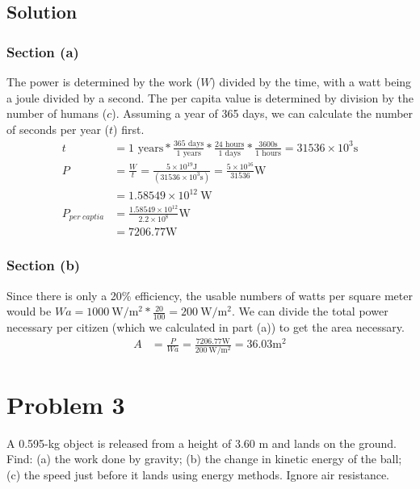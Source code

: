 \documentclass[12pt]{article}
\begin{document}
\subsection*{Solution}
\subsubsection*{Section (a)}
The power is determined by the work ($W$) divided by the time, with a watt being a joule divided by a second. The per capita value is determined by division by the number of humans ($c$). Assuming a year of 365 days, we can calculate the number of seconds per year ($t$) first.
\begin{align*}
    t   &=  1 \text{ years} * \frac{365\text{ days}}{1\text{ years}} 
                            * \frac{24\text{ hours}}{1\text{ days}}
                            * \frac{3600\unit{\second}}{1\text{ hours}}
        =   31536 \times 10^3 \unit{\second}\\
    P   &=  \frac{W}{t}
        =   \frac{5 \times 10^{19} \unit{\joule}}{(31536 \times 10^3 \unit{\second})}
        =   \frac{5 \times 10^{16}}{31536} \unit{\watt}\\
        &=  1.58549 \times 10^{12}\ \unit{\watt}\\
    P_{per\ captia}  &=  \frac{1.58549 \times 10^{12}}{2.2 \times 10^8} \unit{\watt}\\
        &=  \boxed{ 7206.77 \unit{\watt} }
\end{align*}

\subsubsection*{Section (b)}
Since there is only a 20\% efficiency, the usable numbers of watts per square meter would be $ Wa = 1000\ \unit{\watt/\meter^2}*\frac{20}{100} = 200\ \unit{\watt/\meter^2} $. We can divide the total power necessary per citizen (which we calculated in part (a)) to get the area necessary.
\begin{align*}
    A   &= \frac{P}{Wa}
        = \frac{ 7206.77 \unit{\watt} }{ 200\ \unit{\watt/\meter^2} }
        = \boxed{36.03 \unit{\meter^2}}
\end{align*}

\pagebreak
\section*{Problem 3}
A 0.595-kg object is released from a height of 3.60 m and lands on the ground. Find: (a) the work done by gravity; (b) the change in kinetic energy of the ball; (c) the speed just before it lands using energy methods. Ignore air resistance.
\end{document}
